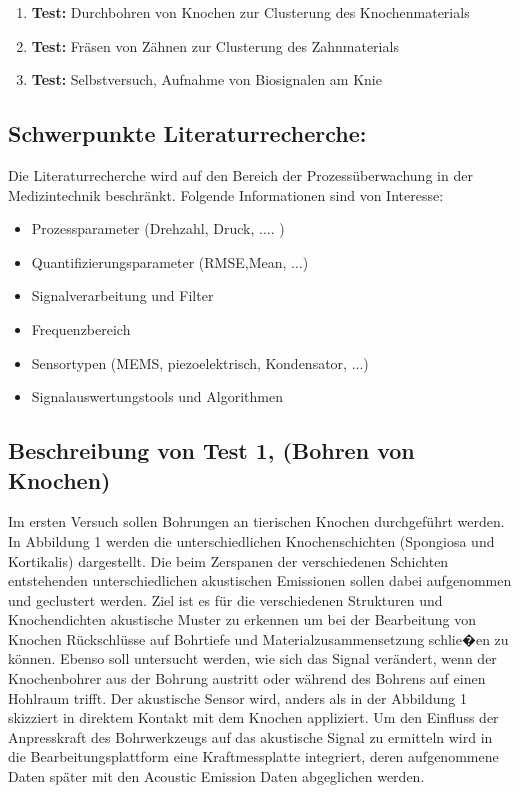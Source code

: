 \documentclass[twoside, 12pt, a4paper]{article}
\begin{document}
\begin{enumerate}
	\item{\textbf{Test:} Durchbohren von Knochen zur Clusterung des Knochenmaterials  }
	\item{\textbf{Test:} Fr\"asen von Z\"ahnen zur Clusterung des Zahnmaterials}
	\item{\textbf{Test:} Selbstversuch, Aufnahme von Biosignalen am Knie}
\end{enumerate}


\subsection{Schwerpunkte Literaturrecherche:}

Die Literaturrecherche wird auf den Bereich der Prozess\"uberwachung in der Medizintechnik beschr\"ankt. Folgende Informationen sind von Interesse: 

\begin{itemize}
	\item{Prozessparameter (Drehzahl, Druck, .... )}
	\item{Quantifizierungsparameter (RMSE,Mean, ...)}
	\item{Signalverarbeitung und Filter }
	\item{Frequenzbereich } 
	\item{Sensortypen (MEMS, piezoelektrisch, Kondensator, ...) }
	\item{Signalauswertungstools und Algorithmen}
\end{itemize}

\subsection{Beschreibung von Test 1, (Bohren von Knochen)}

Im ersten Versuch sollen Bohrungen an tierischen Knochen durchgef\"uhrt werden. In Abbildung 1 werden die unterschiedlichen Knochenschichten (Spongiosa und Kortikalis) dargestellt. Die beim Zerspanen der verschiedenen Schichten entstehenden unterschiedlichen akustischen Emissionen sollen dabei aufgenommen und geclustert werden. Ziel ist es f\"ur die verschiedenen Strukturen und Knochendichten akustische Muster zu erkennen um bei der Bearbeitung von Knochen R\"uckschl\"usse auf Bohrtiefe und Materialzusammensetzung schlie�en zu k\"onnen. Ebenso soll untersucht werden, wie sich das Signal ver\"andert, wenn der Knochenbohrer aus der Bohrung austritt oder w\"ahrend des Bohrens auf einen Hohlraum trifft. Der akustische Sensor wird, anders als in der Abbildung 1 skizziert in direktem Kontakt mit dem Knochen appliziert. Um den Einfluss der Anpresskraft des Bohrwerkzeugs auf das akustische Signal zu ermitteln wird in die Bearbeitungsplattform eine Kraftmessplatte integriert, deren aufgenommene Daten sp\"ater mit den Acoustic Emission Daten abgeglichen werden.
\end{document}
